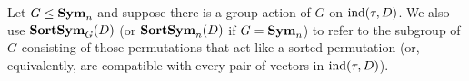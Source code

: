 \documentclass[../paper.tex]{subfiles}
\begin{document}
Let $G \leq \text{\textbf{Sym}}_n$ and suppose there is a group action of $G$ on
$\text{\upshape ind}(\tau, D)$. We also use $\text{\textbf{SortSym}}_G (D)$ (or
$\text{\textbf{SortSym}}_n(D)$ if $G = \text{\textbf{Sym}}_n$) to refer to the subgroup of $G$
consisting of those permutations that act like a sorted permutation
(or, equivalently, are compatible with every pair  of vectors in
$\text{\upshape ind}(\tau, D)$).


\end{document}
